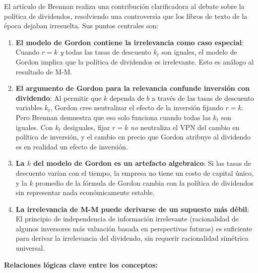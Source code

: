 \documentclass[12pt]{article}
\begin{document}
El art\'iculo de Brennan realiza una contribuci\'on clarificadora al debate sobre la pol\'itica de dividendos, resolviendo una controversia que los libros de texto de la \'epoca dejaban irresuelta. Sus puntos centrales son:

\begin{enumerate}
  \item \textbf{El modelo de Gordon contiene la irrelevancia como caso especial}: Cuando $r = k$ \textit{y} todas las tasas de descuento $k_t$ son iguales, el modelo de Gordon implica que la pol\'itica de dividendos es irrelevante. Esto es an\'alogo al resultado de M-M.

  \item \textbf{El argumento de Gordon para la relevancia confunde inversi\'on con dividendo}: Al permitir que $k$ dependa de $b$ a trav\'es de las tasas de descuento variables $k_t$, Gordon cree neutralizar el efecto de la inversi\'on fijando $r = k$. Pero Brennan demuestra que eso solo funciona cuando todas las $k_t$ son iguales. Con $k_t$ desiguales, fijar $r = k$ \textit{no} neutraliza el VPN del cambio en pol\'itica de inversi\'on, y el cambio en precio que Gordon atribuye al dividendo es en realidad un efecto de inversi\'on.

  \item \textbf{La $k$ del modelo de Gordon es un artefacto algebraico}: Si las tasas de descuento var\'ian con el tiempo, la empresa no tiene un costo de capital \'unico, y la $k$ promedio de la f\'ormula de Gordon cambia con la pol\'itica de dividendos sin representar nada econ\'omicamente estable.

  \item \textbf{La irrelevancia de M-M puede derivarse de un supuesto m\'as d\'ebil}: El principio de independencia de informaci\'on irrelevante (racionalidad de algunos inversores m\'as valuaci\'on basada en perspectivas futuras) es suficiente para derivar la irrelevancia del dividendo, sin requerir racionalidad sim\'etrica universal.
\end{enumerate}

\bigskip
\noindent\textbf{Relaciones l\'ogicas clave entre los conceptos:}
\end{document}
